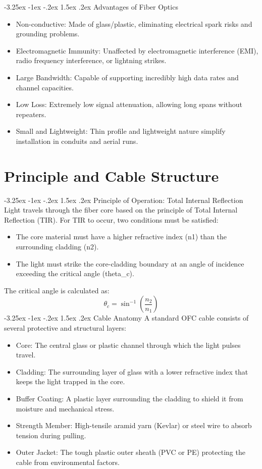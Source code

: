 \documentclass[11pt,a4paper]{report}
\makeatletter
\renewcommand{\section}{\@startsection{section}{1}{\z@}%
  {-3.25ex \@plus -1ex \@minus -.2ex}%
  {1.5ex \@plus.2ex}%
  {\normalfont\Large\bfseries\color{primaryColor}}}
\makeatother
\begin{document}
\section{Advantages of Fiber Optics}
\begin{itemize}
  \item Non-conductive: Made of glass/plastic, eliminating electrical spark risks and grounding problems.
  \item Electromagnetic Immunity: Unaffected by electromagnetic interference (EMI), radio frequency interference, or lightning strikes.
  \item Large Bandwidth: Capable of supporting incredibly high data rates and channel capacities.
  \item Low Loss: Extremely low signal attenuation, allowing long spans without repeaters.
  \item Small and Lightweight: Thin profile and lightweight nature simplify installation in conduits and aerial runs.
\end{itemize}
\chapter{Principle and Cable Structure}
\section{Principle of Operation: Total Internal Reflection}
Light travels through the fiber core based on the principle of Total Internal Reflection (TIR). For TIR to occur, two conditions must be satisfied:
\begin{itemize}
  \item The core material must have a higher refractive index (n1) than the surrounding cladding (n2).
  \item The light must strike the core-cladding boundary at an angle of incidence exceeding the critical angle (theta\_c).
\end{itemize}
The critical angle is calculated as:
\begin{equation}\theta_c = \sin^{-1}\left( \frac{n_2}{n_1} \right)\end{equation}
\section{Cable Anatomy}
A standard OFC cable consists of several protective and structural layers:
\begin{itemize}
  \item Core: The central glass or plastic channel through which the light pulses travel.
  \item Cladding: The surrounding layer of glass with a lower refractive index that keeps the light trapped in the core.
  \item Buffer Coating: A plastic layer surrounding the cladding to shield it from moisture and mechanical stress.
  \item Strength Member: High-tensile aramid yarn (Kevlar) or steel wire to absorb tension during pulling.
  \item Outer Jacket: The tough plastic outer sheath (PVC or PE) protecting the cable from environmental factors.
\end{itemize}
\end{document}
